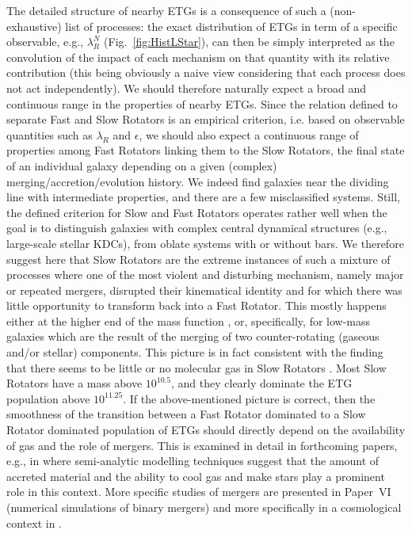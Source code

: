 \documentclass[useAMS,usenatbib,usegraphicx]{mn2e}
\begin{document}
The detailed structure of nearby ETGs is a consequence of such a (non-exhaustive)
list of processes: the exact distribution of ETGs in term of a specific
observable, e.g., $\lambda_R^N$ (Fig.~\ref{fig:HistLStar}), can then be simply interpreted 
as the convolution of the impact of each mechanism on that quantity  with
its relative contribution (this being obviously a naive view considering that
each process does not act independently). We should therefore naturally expect 
a broad and continuous range in the properties of nearby ETGs.
Since the relation defined to separate Fast and Slow Rotators is an 
empirical criterion, i.e. based on observable quantities such as $\lambda_R$ 
and $\epsilon$, we should also expect a continuous 
range of properties among Fast Rotators linking them to the Slow Rotators,
the final state of an individual galaxy 
depending on a given (complex) merging/accretion/evolution history. 
We indeed find galaxies near the dividing line with intermediate
properties, and there are a few misclassified systems.
Still, the defined criterion for Slow and Fast Rotators 
operates rather well when the goal is to distinguish galaxies with
complex central dynamical structures (e.g., large-scale stellar KDCs), from oblate systems with or without bars.
We therefore suggest here that Slow Rotators are the extreme instances of such a
mixture of processes where one of the most violent and disturbing mechanism, namely
major or repeated mergers, disrupted their kinematical identity and for which
there was little opportunity to transform back into a Fast Rotator. This mostly
happens either at the higher end of the mass function \citep[e.g.][]{Khochfar+06,
Oser+10}, or, specifically, for low-mass galaxies which are the result of the merging of two counter-rotating 
(gaseous and/or stellar) components. This picture is in fact consistent with the finding
that there seems to be little or no molecular gas in Slow Rotators \citep[][Paper~IV]{Young+11}.
Most Slow Rotators have a mass above $10^{10.5}$, and they clearly dominate the
ETG population above $10^{11.25}$. If the above-mentioned picture is correct,
then the smoothness of the transition between a Fast Rotator dominated 
to a Slow Rotator dominated population of ETGs should directly depend on the
availability of gas and the role of mergers. This is examined in detail in forthcoming papers, e.g., 
in \cite{Khochfar+11} where semi-analytic modelling techniques suggest that the amount of 
accreted material and the ability to cool gas and make stars play a prominent role in 
this context. More specific studies of mergers are presented in Paper~VI
(numerical simulations of binary mergers) and more specifically in a
cosmological context in \cite{Naab+11}.
\end{document}
